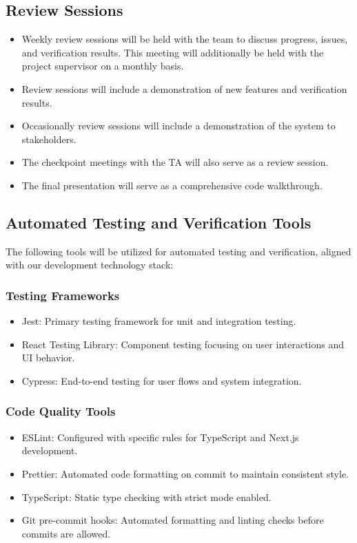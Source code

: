 \documentclass[12pt, titlepage]{article}
\begin{document}
\subsection*{Review Sessions}
\begin{itemize}
  \item Weekly review sessions will be held with the team to discuss progress, issues, and verification results. This meeting will additionally be held with the project supervisor on a monthly basis.
  \item Review sessions will include a demonstration of new features and verification results.
  \item Occasionally review sessions will include a demonstration of the system to stakeholders.
  \item The checkpoint meetings with the TA will also serve as a review session.
  \item The final presentation will serve as a comprehensive code walkthrough.
\end{itemize}

\subsection{Automated Testing and Verification Tools}
The following tools will be utilized for automated testing and verification, aligned with our development technology stack:

\subsubsection*{Testing Frameworks}
\begin{itemize}
    \item Jest: Primary testing framework for unit and integration testing.
    \item React Testing Library: Component testing focusing on user interactions and UI behavior.
    \item Cypress: End-to-end testing for user flows and system integration.
\end{itemize}

\subsubsection*{Code Quality Tools}
\begin{itemize}
    \item ESLint: Configured with specific rules for TypeScript and Next.js development.
    \item Prettier: Automated code formatting on commit to maintain consistent style.
    \item TypeScript: Static type checking with strict mode enabled.
    \item Git pre-commit hooks: Automated formatting and linting checks before commits are allowed.
\end{itemize}
\end{document}
